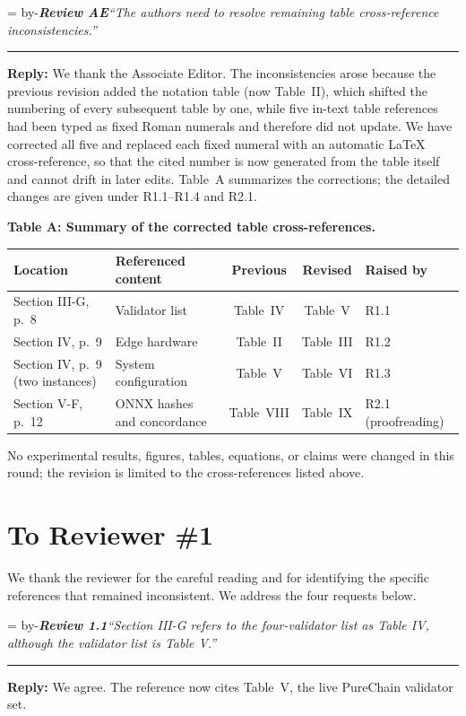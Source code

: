 \documentclass[11pt]{article}
\newcommand{\roomfor}[1]{\par\begingroup\dimen0=\pagegoal\advance\dimen0 by-\pagetotal\ifdim\dimen0<#1\baselineskip\newpage\fi\endgroup}
\newcommand{\review}[2]{\roomfor{10}\bigskip\noindent\textbf{\textit{Review #1}}\quad\textit{``#2''}\par\smallskip\hrule\medskip}
\newcommand{\reply}{\noindent\textbf{Reply:} }
\begin{document}
\newpage

\review{AE}{The authors need to resolve remaining table cross-reference inconsistencies.}

\reply We thank the Associate Editor. The inconsistencies arose because the
previous revision added the notation table (now Table~II), which shifted the
numbering of every subsequent table by one, while five in-text table
references had been typed as fixed Roman numerals and therefore did not
update. We have corrected all five and replaced each fixed numeral with an
automatic \LaTeX{} cross-reference, so that the cited number is now generated
from the table itself and cannot drift in later edits. Table~A summarizes the
corrections; the detailed changes are given under R1.1--R1.4 and R2.1.

\begin{center}
\textbf{Table A: Summary of the corrected table cross-references.}\par\smallskip
\small
\begin{tabular}{@{}llccl@{}}
\toprule
Location & Referenced content & Previous & Revised & Raised by \\
\midrule
Section III-G, p.~8 & Validator list & Table~IV & Table~V & R1.1 \\
Section IV, p.~9 & Edge hardware & Table~II & Table~III & R1.2 \\
Section IV, p.~9 (two instances) & System configuration & Table~V & Table~VI & R1.3 \\
Section V-F, p.~12 & ONNX hashes and concordance & Table~VIII & Table~IX & R2.1 (proofreading) \\
\bottomrule
\end{tabular}
\end{center}

No experimental results, figures, tables, equations, or claims were changed
in this round; the revision is limited to the cross-references listed above.

\clearpage
\section*{To Reviewer \#1}
We thank the reviewer for the careful reading and for identifying the
specific references that remained inconsistent. We address the four
requests below.

\review{1.1}{Section III-G refers to the four-validator list as Table IV, although the validator list is Table V.}

\reply We agree. The reference now cites Table~V, the live PureChain
validator set.
\end{document}
